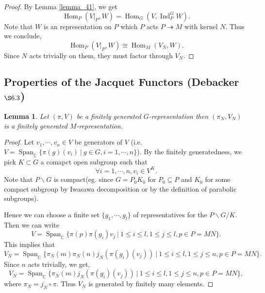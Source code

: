 \documentclass[8pt]{article}
\newtheorem{lemma}{Lemma}[section]
\DeclareMathOperator{\Ind}{Ind}
\DeclareMathOperator{\Hom}{Hom}
\DeclareMathOperator{\Span}{Span}
\newcommand{\C}[0]{\mathbb{C}}
\newcommand{\sep}[0]{\:|\:}
\begin{document}
\begin{proof}
  By Lemma \ref{lemma_41}, we get 
  \begin{equation*}
    \Hom_P(V|_P,W) = \Hom_G(V,\Ind_P^GW).
  \end{equation*}
  Note that $W$ is an representation on $P$ which $P$ acts $P\twoheadrightarrow M$ with kernel $N$. Thus we conclude,
  \begin{equation*}
    \Hom_P(V|_P,W) \cong \Hom_M(V_N,W).
  \end{equation*}
  Since $N$ acts trivially on them, they must factor through $V_N$.
\end{proof}

\subsection{Properties of the Jacquet Functors (Debacker $\S6.3$)}

\begin{lemma}
  \label{lemma_43}
  Let $(\pi,V)$ be a finitely generated $G$-representation then $(\pi_N,V_N)$ is a finitely generated $M$-representation.
\end{lemma}

\begin{proof}
  Let $v_1,\cdots,v_n\in V$ be generators of $V$ (i.e. $V= \Span_\C\{\pi(g)(v_i)\sep g\in G,i=1,\cdots,n\}$). By the finitely generatedness, we pick $K\subset G$ a comapct open subgroup such that 
  \begin{equation*}
    \forall i=1,\cdots,n, v_i\in V^K.
  \end{equation*}
  Note that $P\backslash G$ is compact(eg. since $G = P_0K_0$ for $P_0\subseteq P$ and $K_0$ for some compact subgroup by Iwasawa decomposition or by the definition of parabolic subgroups).
  \par Hence we can choose a finite set $\{g_1,\cdots,g_l\}$ of representatives for the $P\backslash G/K$. Then we can write
  \begin{equation*}
    V = \Span_\C\{\pi(p)\pi(g_i)v_j\sep 1\leq i\leq l, 1\leq j\leq l,p\in P = MN\}.
  \end{equation*}
  This implies that 
  \begin{equation*}
    V_N = \Span_\C\{\pi_N(m)\pi_N(n)j_N(\pi(g_i)(v_j))\sep 1\leq i\leq l, 1\leq j\leq n,p\in P = MN\}.
  \end{equation*}
  Since $n$ acts trivially, we get,
  \begin{equation*}
    V_N = \Span_\C\{\pi_N(m)j_N(\pi(g_i)(v_j))\sep 1\leq i\leq l, 1\leq j\leq n,p\in P = MN\},
  \end{equation*}
  where $\pi_N = j_N\circ\pi$. Thus $V_N$ is generated by finitely many elements.
\end{proof}
\end{document}
